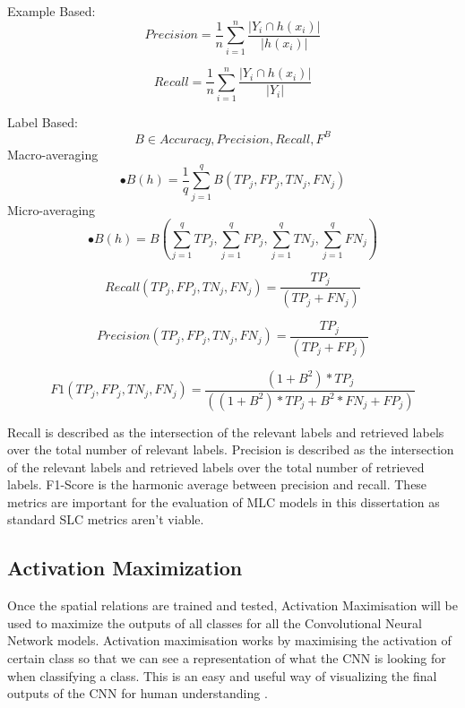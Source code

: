 \documentclass{csfyp}
\begin{document}
Example Based:
\begin{equation}
Precision = \frac{1}{n}\sum_{i=1}^{n}\frac{|Y_{i}\cap h(x_{i})|}{|h(x_{i})|}
\end{equation}

\begin{equation}
Recall = \frac{1}{n}\sum_{i=1}^{n}\frac{|Y_{i}\cap h(x_{i})|}{|Y_{i}|}
\end{equation}

Label Based:
\begin{equation}
B \in { Accuracy, Precision, Recall, F^B} 
\end{equation}
Macro-averaging
\begin{equation}
•B(h) = \frac{1}{q}\sum_{j=1}^{q} B(TP_j,FP_j,TN_j,FN_j)
\end{equation}
Micro-averaging
\begin{equation}
•B(h) = B(\sum_{j=1}^{q} TP_j,\sum_{j=1}^{q} FP_j,\sum_{j=1}^{q} TN_j,\sum_{j=1}^{q} FN_j)
\end{equation}

\begin{equation}
Recall(TP_j,FP_j,TN_j,FN_j) = \frac{TP_j}{(TP_j + FN_j)}
\end{equation}

\begin{equation}
Precision(TP_j,FP_j,TN_j,FN_j) = \frac{TP_j}{(TP_j + FP_j)}
\end{equation}

\begin{equation}
F1(TP_j,FP_j,TN_j,FN_j) = \frac{(1+B^2)*TP_j}{((1+B^2)*TP_j+B^2*FN_j+FP_j)}
\end{equation}


Recall is described as the intersection of the relevant labels and retrieved labels over the total number of relevant labels. Precision is described as the intersection of the relevant labels and retrieved labels over the total number of retrieved labels. F1-Score is the harmonic average between precision and recall. These metrics are important for the evaluation of MLC models in this dissertation as standard SLC metrics aren't viable.

\subsection{Activation Maximization}
Once the spatial relations are trained and tested, Activation Maximisation will be used to maximize the outputs of all classes for all the Convolutional Neural Network models. Activation maximisation works by maximising the activation of certain class so that we can see a representation of what the CNN is looking for when classifying a class. This is an easy and useful way of visualizing the final outputs of the CNN for human understanding . 
\end{document}

